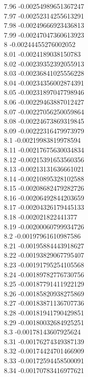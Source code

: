 {7.96	-0.00254989651367247\\
7.97	-0.00252314255613291\\
7.98	-0.00249666923436813\\
7.99	-0.00247047360613923\\
8	-0.00244455276002052\\
8.01	-0.0024189038150783\\
8.02	-0.00239352392055913\\
8.03	-0.00236841025556228\\
8.04	-0.00234356002874391\\
8.05	-0.00231897047798946\\
8.06	-0.00229463887012427\\
8.07	-0.00227056250059864\\
8.08	-0.00224673869319845\\
8.09	-0.00222316479973979\\
8.1	-0.00219983819978594\\
8.11	-0.00217675630034834\\
8.12	-0.00215391653560356\\
8.13	-0.00213131636661021\\
8.14	-0.00210895328102588\\
8.15	-0.00208682479282726\\
8.16	-0.00206492844203659\\
8.17	-0.00204326179445133\\
8.18	-0.002021822441377\\
8.19	-0.00200060799934726\\
8.2	-0.00197961610987586\\
8.21	-0.00195884443918627\\
8.22	-0.00193829067795407\\
8.23	-0.00191795254105568\\
8.24	-0.00189782776730756\\
8.25	-0.00187791411922129\\
8.26	-0.00185820938275869\\
8.27	-0.00183871136707736\\
8.28	-0.00181941790429851\\
8.29	-0.00180032684925251\\
8.3	-0.00178143607925624\\
8.31	-0.00176274349387139\\
8.32	-0.00174424701466909\\
8.33	-0.00172594458500091\\
8.34	-0.00170783416977621\\
}
